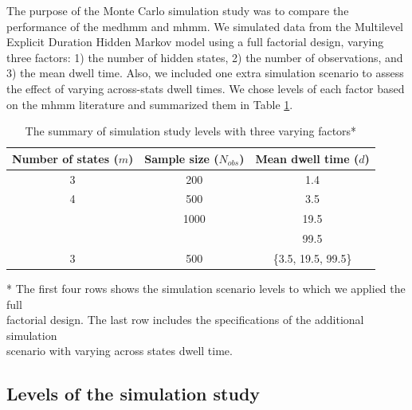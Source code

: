 The purpose of the Monte Carlo simulation study was to compare the performance of the \ac{medhmm} and \ac{mhmm}. We simulated data from the Multilevel Explicit Duration Hidden Markov model using a full factorial design, varying three factors: 1) the number of hidden states, 2) the number of observations, and 3) the mean dwell time. Also, we included one extra simulation scenario to assess the effect of varying across-stats dwell times. We chose levels of each factor based on the \ac{mhmm} literature and summarized them in Table \ref{tb1}.\\ 

\begin{table}[h]

\caption{The summary of simulation study levels with three varying factors*}\label{tb1}
\begin{tabular}{c|c|c} 
\hline
Number of states ($m$)& Sample size ($N_{obs}$) & Mean dwell time ($d$) \\ 
\hline
3 & 200 & 1.4 \\
4 & 500 & 3.5 \\
 & 1000 & 19.5 \\
 & & 99.5 \\
\hline
3 & 500 & \{3.5, 19.5, 99.5\} \\
\hline
\end{tabular}
\flushleft
\footnotesize
\justifying
* The first four rows shows the simulation scenario levels to which we applied the full\\factorial design.
The last row includes the specifications of the additional simulation\\ scenario with varying across states dwell time. 
\end{table}

\subsection{Levels of the simulation study}
